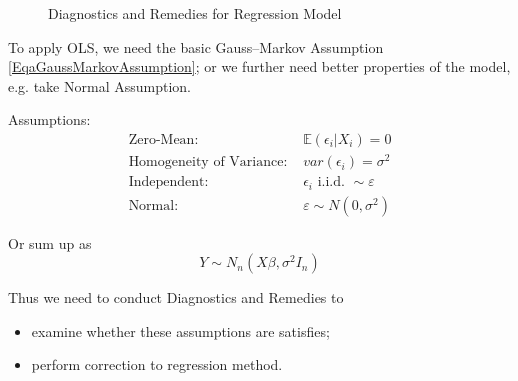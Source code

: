 \begin{figure}[htbp]
\begin{center}
    \caption{Diagnostics and Remedies for Regression Model}
    
\end{center}
\end{figure}






    To apply OLS, we need the basic Gauss–Markov Assumption \autoref{EqaGaussMarkovAssumption}; or we further need better properties of the model, e.g. take Normal Assumption.
    
    Assumptions:
    \begin{equation}
        \begin{aligned}
            \text{Zero-Mean: }&\mathbb{E}(\epsilon_i|X_i)=0 \\
            \text{Homogeneity of Variance: }&var(\epsilon_i)=\sigma^2\\
            \text{Independent: }&\epsilon_i\text{ i.i.d. }\sim \varepsilon\\
            \text{Normal: }&\varepsilon \sim N(0,\sigma^2)
        \end{aligned}
    \end{equation}
    
    Or sum up as 
    \begin{equation}
        Y\sim N_n(X\beta ,\sigma^2I_n) 
    \end{equation}
    
    
    
    Thus we need to conduct Diagnostics and Remedies to 
    \begin{itemize}[topsep=2pt,itemsep=0pt]
        \item examine whether these assumptions are satisfies;
        \item perform correction to regression method.
    \end{itemize}

